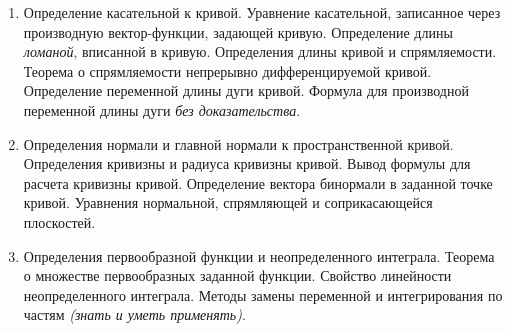 \documentclass[a4paper,12pt]{article}
\begin{document}
\begin{enumerate}
	\item Определение касательной к кривой. Уравнение касательной, записанное через производную вектор-функции, задающей кривую. Определение длины \textit{ломаной}, вписанной в кривую. Определения длины кривой и спрямляемости. Теорема о спрямляемости непрерывно дифференцируемой кривой. Определение переменной длины дуги кривой. Формула для производной переменной длины дуги \textit{без доказательства}.
	\item Определения нормали и главной нормали к пространственной кривой. Определения кривизны и радиуса кривизны кривой. Вывод формулы для расчета кривизны кривой. Определение вектора бинормали в заданной точке кривой. Уравнения нормальной, спрямляющей и соприкасающейся плоскостей.
	\item Определения первообразной функции и неопределенного интеграла. Теорема о множестве первообразных заданной функции. Свойство линейности неопределенного интеграла. Методы замены переменной и интегрирования по частям \textit{(знать и уметь применять)}. 
\end{enumerate}
\end{document}
